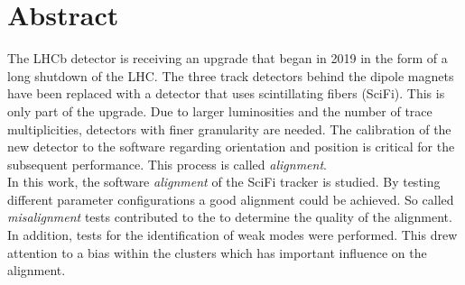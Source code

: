 \chapter*{Abstract}
\label{sec:abstract}

The LHCb detector is receiving an upgrade that began in 2019 in the form of a long
shutdown of the LHC. The three track detectors behind the dipole magnets have been
replaced with a detector that uses scintillating fibers (SciFi).
This is only part of the upgrade. Due to larger luminosities and the
number of trace multiplicities, detectors with finer granularity are needed.
The calibration of the new detector to the software regarding
orientation and position is critical for the subsequent performance. This
process is called \textit{alignment}.
\\
In this work, the software \textit{alignment} of the SciFi tracker is studied.
By testing different parameter configurations a good alignment could be achieved.
So called \textit{misalignment} tests contributed to the to determine the quality
of the alignment. In addition, tests for the identification of weak modes were performed.
This drew attention to a bias within the clusters which has important influence
on the alignment.
